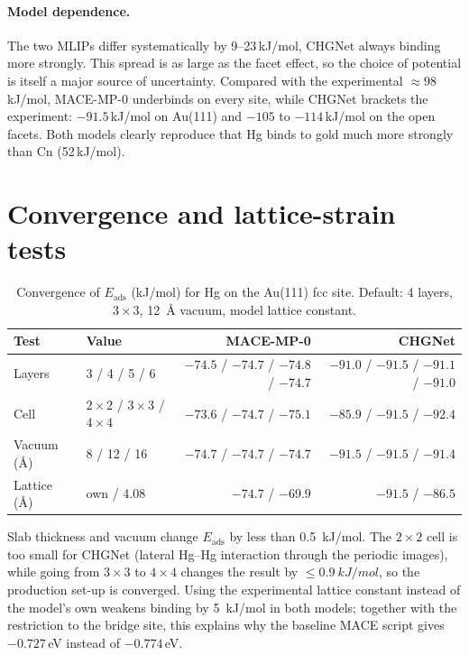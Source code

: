 \documentclass[11pt,a4paper]{article}
\begin{document}
\paragraph{Model dependence.} The two MLIPs differ systematically by 9--23\,kJ/mol, CHGNet always binding more
strongly. This spread is as large as the facet effect, so the choice of potential is itself a major source of
uncertainty. Compared with the experimental $\approx98$\,kJ/mol, MACE-MP-0 underbinds on every site, while
CHGNet brackets the experiment: $-91.5$\,kJ/mol on Au(111) and $-105$ to $-114$\,kJ/mol on the open facets.
Both models clearly reproduce that Hg binds to gold much more strongly than Cn (52\,kJ/mol).

\section{Convergence and lattice-strain tests}
\begin{table}[h]\centering
\caption{Convergence of $E_\mathrm{ads}$ (kJ/mol) for Hg on the Au(111) fcc site. Default: 4 layers,
$3\times3$, \SI{12}{\AA} vacuum, model lattice constant.}\label{tab:conv}
\small\begin{tabular}{llrr}\toprule
Test & Value & MACE-MP-0 & CHGNet\\\midrule
Layers & 3 / 4 / 5 / 6 & $-74.5$ / $-74.7$ / $-74.8$ / $-74.7$ & $-91.0$ / $-91.5$ / $-91.1$ / $-91.0$\\
Cell & $2\times2$ / $3\times3$ / $4\times4$ & $-73.6$ / $-74.7$ / $-75.1$ & $-85.9$ / $-91.5$ / $-92.4$\\
Vacuum (\AA) & 8 / 12 / 16 & $-74.7$ / $-74.7$ / $-74.7$ & $-91.5$ / $-91.5$ / $-91.4$\\
Lattice (\AA) & own / 4.08 & $-74.7$ / $-69.9$ & $-91.5$ / $-86.5$\\\bottomrule
\end{tabular}\end{table}

Slab thickness and vacuum change $E_\mathrm{ads}$ by less than \SI{0.5}{kJ/mol}. The $2\times2$ cell is too
small for CHGNet (lateral Hg--Hg interaction through the periodic images), while going from $3\times3$ to
$4\times4$ changes the result by $\le\SI{0.9}{kJ/mol}$, so the production set-up is converged. Using the
experimental lattice constant instead of the model's own weakens binding by \SI{5}{kJ/mol} in both models;
together with the restriction to the bridge site, this explains why the baseline MACE script gives $-0.727$\,eV
instead of $-0.774$\,eV.
\end{document}
